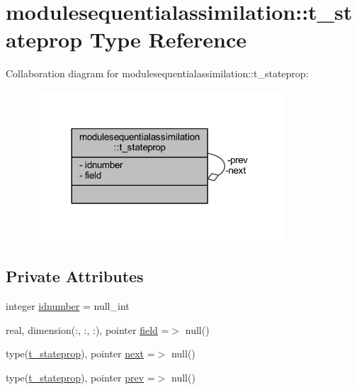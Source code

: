 \hypertarget{structmodulesequentialassimilation_1_1t__stateprop}{}\section{modulesequentialassimilation\+:\+:t\+\_\+stateprop Type Reference}
\label{structmodulesequentialassimilation_1_1t__stateprop}


Collaboration diagram for modulesequentialassimilation\+:\+:t\+\_\+stateprop\+:\nopagebreak
\begin{figure}[H]
\begin{center}
\leavevmode
\includegraphics[width=266pt]{structmodulesequentialassimilation_1_1t__stateprop__coll__graph}
\end{center}
\end{figure}
\subsection*{Private Attributes}
\begin{DoxyCompactItemize}
\item 
integer \mbox{\hyperlink{structmodulesequentialassimilation_1_1t__stateprop_a0e3cb0fefca3dcc35a1c90f00923210e}{idnumber}} = null\+\_\+int
\item 
real, dimension(\+:, \+:, \+:), pointer \mbox{\hyperlink{structmodulesequentialassimilation_1_1t__stateprop_ad8ee482fcabd435cbe1ecff6b7d056ec}{field}} =$>$ null()
\item 
type(\mbox{\hyperlink{structmodulesequentialassimilation_1_1t__stateprop}{t\+\_\+stateprop}}), pointer \mbox{\hyperlink{structmodulesequentialassimilation_1_1t__stateprop_a1329915e0f28f6152f48133c04bda680}{next}} =$>$ null()
\item 
type(\mbox{\hyperlink{structmodulesequentialassimilation_1_1t__stateprop}{t\+\_\+stateprop}}), pointer \mbox{\hyperlink{structmodulesequentialassimilation_1_1t__stateprop_ad6a919269515c178ede320274a64451b}{prev}} =$>$ null()
\end{DoxyCompactItemize}


